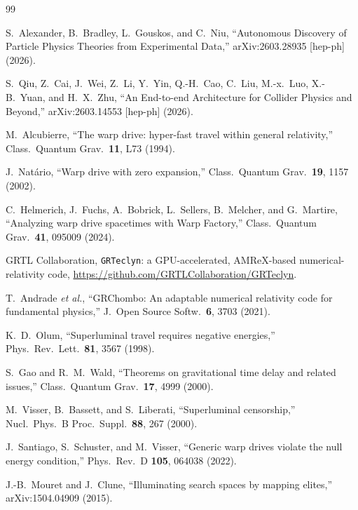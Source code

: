 \documentclass[twocolumn,floatfix,aps,prd,nofootinbib]{revtex4-2}
\begin{document}
\begin{thebibliography}{99}

S.~Alexander, B.~Bradley, L.~Gouskos, and C.~Niu,
\newblock ``Autonomous Discovery of Particle Physics Theories from Experimental Data,''
\newblock arXiv:2603.28935 [hep-ph] (2026).

S.~Qiu, Z.~Cai, J.~Wei, Z.~Li, Y.~Yin, Q.-H.~Cao, C.~Liu, M.-x.~Luo, X.-B.~Yuan, and H.~X.~Zhu,
\newblock ``An End-to-end Architecture for Collider Physics and Beyond,''
\newblock arXiv:2603.14553 [hep-ph] (2026).

M.~Alcubierre,
\newblock ``The warp drive: hyper-fast travel within general relativity,''
\newblock Class.\ Quantum Grav.\ \textbf{11}, L73 (1994).

J.~Nat\'ario,
\newblock ``Warp drive with zero expansion,''
\newblock Class.\ Quantum Grav.\ \textbf{19}, 1157 (2002).

C.~Helmerich, J.~Fuchs, A.~Bobrick, L.~Sellers, B.~Melcher, and G.~Martire,
\newblock ``Analyzing warp drive spacetimes with Warp Factory,''
\newblock Class.\ Quantum Grav.\ \textbf{41}, 095009 (2024).

GRTL Collaboration, \texttt{GRTeclyn}: a GPU-accelerated, AMReX-based
numerical-relativity code,
\url{https://github.com/GRTLCollaboration/GRTeclyn}.

T.~Andrade \textit{et al.},
\newblock ``GRChombo: An adaptable numerical relativity code for fundamental
physics,''
\newblock J.\ Open Source Softw.\ \textbf{6}, 3703 (2021).

K.~D.~Olum,
\newblock ``Superluminal travel requires negative energies,''
\newblock Phys.\ Rev.\ Lett.\ \textbf{81}, 3567 (1998).

S.~Gao and R.~M.~Wald,
\newblock ``Theorems on gravitational time delay and related issues,''
\newblock Class.\ Quantum Grav.\ \textbf{17}, 4999 (2000).

M.~Visser, B.~Bassett, and S.~Liberati,
\newblock ``Superluminal censorship,''
\newblock Nucl.\ Phys.\ B Proc.\ Suppl.\ \textbf{88}, 267 (2000).

J.~Santiago, S.~Schuster, and M.~Visser,
\newblock ``Generic warp drives violate the null energy condition,''
\newblock Phys.\ Rev.\ D \textbf{105}, 064038 (2022).

J.-B.~Mouret and J.~Clune,
\newblock ``Illuminating search spaces by mapping elites,''
\newblock arXiv:1504.04909 (2015).


\end{thebibliography}
\end{document}
